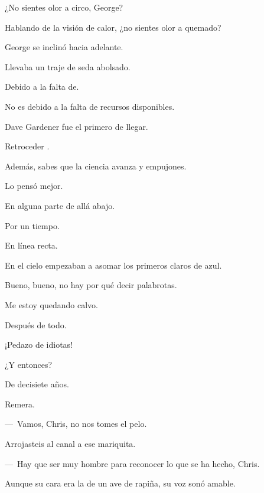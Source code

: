 \sk
¿No sientes olor a circo, George? \nb{}

\sk
Hablando de la visión de calor, ¿no sientes olor a quemado? 

\sk
George se inclinó hacia adelante. \nb{}

\sk
Llevaba un traje de seda abolsado. 

\sk
Debido a la falta de. 

\sk
No es debido a la falta de recursos disponibles. 

\sk
Dave Gardener fue el primero de llegar. 

\sk
Retroceder . 

\sk
Además, sabes que la ciencia avanza  y empujones. 

\sk
Lo pensó mejor. 

\sk
En alguna parte de allá abajo. 

\sk
Por un tiempo. 

\sk
En línea recta. 

\sk
En el cielo empezaban a asomar los primeros claros de azul. \nb{}

\sk
Bueno, bueno, no hay por qué decir palabrotas. 

\sk
Me estoy quedando calvo. 

\sk
Después de todo. 

\sk
¡Pedazo de idiotas! 

\sk
¿Y entonces? 

\sk
De decisiete años. 

\sk
Remera. 

\sk
---~Vamos, Chris, no nos tomes el pelo. 

\sk
Arrojasteis al canal a ese mariquita. 

\sk
---~Hay que ser muy hombre para reconocer lo que se ha hecho, Chris. \nb{}

\sk
Aunque su cara era la de un ave de rapiña, su voz sonó amable. 

